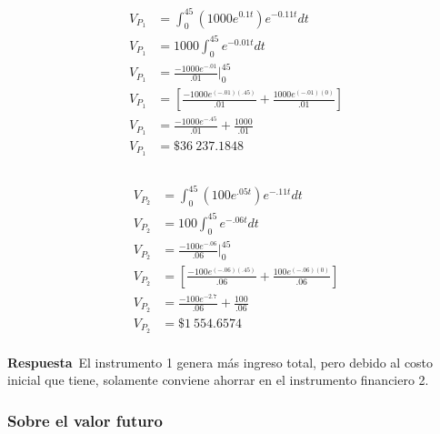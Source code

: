 \documentclass{article}
\begin{document}
                    \begin{equation*}
                    \begin{split}
                        V_{P_{1}}&=\int_{0}^{45} (1000e^{0.1t})e^{-0.11t} dt \\
                        V_{P_{1}}&=1000\int_{0}^{45}e^{-0.01t} dt \\
                        V_{P_{1}}&=\frac{-1000e^{-.01}}{.01}\Biggr|_{0}^{45} \\
                        V_{P_{1}}&=\left[ \frac{-1000e^{(-.01)(.45)}}{.01}+\frac{1000e^{(-.01)(0)}}{.01}\right] \\
                        V_{P_{1}}&= \frac{-1000e^{-.45}}{.01}+\frac{1000}{.01}\\
                        V_{P_{1}}&=\$36\ 237.1848 \\\\
                    \end{split}
                    \end{equation*}

                    \begin{equation*}
                    \begin{split}
                        V_{P_{2}}&=\int_{0}^{45} (100e^{.05t})e^{-.11t} dt \\
                        V_{P_{2}}&=100\int_{0}^{45}e^{-.06t} dt \\
                        V_{P_{2}}&=\frac{-100e^{-.06}}{.06}\Biggr|_{0}^{45} \\
                        V_{P_{2}}&=\left[ \frac{-100e^{(-.06)(.45)}}{.06}+\frac{100e^{(-.06)(0)}}{.06}\right] \\
                        V_{P_{2}}&= \frac{-100e^{-2.7}}{.06}+\frac{100}{.06}\\
                        V_{P_{2}}&=\$1\ 554.6574 \\
                    \end{split}
                    \end{equation*}

                    \textbf{Respuesta}\
                    El instrumento 1 genera más ingreso total, pero debido al costo inicial que tiene, solamente conviene ahorrar en el instrumento financiero 2.

                \subsubsection{Sobre el valor futuro}
\end{document}
